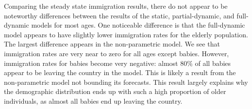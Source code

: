 \documentclass[10pt]{article}
\numberwithin{equation}{subsection}
\begin{document}
\par Comparing the steady state immigration results, there do not appear to be noteworthy differences between the results of the static, partial-dynamic, and full-dynamic models for most ages. One noticeable difference is that the full-dynamic model appears to have slightly lower immigration rates for the elderly population. The largest difference appears in the non-parametric model. We see that immigration rates are very near to zero for all ages except babies. However, immigration rates for babies become very negative: almost 80\% of all babies appear to be leaving the country in the model. This is likely a result from the non-parametric model not bounding its forecasts. This result largely explains why the demographic distribution ends up with such a high proportion of older individuals, as almost all babies end up leaving the country.
\end{document}
